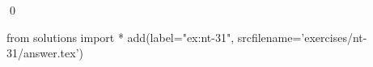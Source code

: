 
\begin{ex} 
  \label{ex:nt-31}
  
  \qed
\end{ex} 
\begin{python0}
from solutions import *
add(label="ex:nt-31",
    srcfilename='exercises/nt-31/answer.tex') 
\end{python0}
